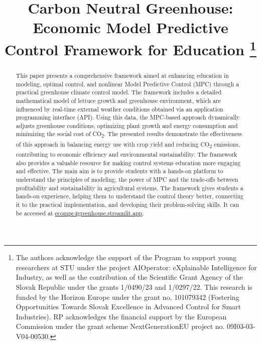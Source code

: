 \documentclass[conference]{IEEEtran}
\begin{document}
\title{\vspace*{18pt}Carbon Neutral Greenhouse: Economic Model Predictive Control Framework for Education
    \thanks{The authors acknowledge the support of the Program to support young researchers at STU under the project AIOperator: eXplainable Intelligence for Industry, as well as the contribution of the Scientific Grant Agency of the Slovak Republic under the grants 1/0490/23 and 1/0297/22. This research is funded by the Horizon Europe under the grant no. 101079342 (Fostering Opportunities Towards Slovak Excellence in Advanced Control for Smart Industries). RP acknowledges the financial support by the European Commission under the grant scheme NextGenerationEU project no. 09I03-03-V04-00530.}
}

\author{
}

\maketitle

\begin{abstract}
    This paper presents a comprehensive framework aimed at enhancing education in modeling, optimal control, and nonlinear Model Predictive Control (MPC) through a practical greenhouse climate control model. The framework includes a detailed mathematical model of lettuce growth and greenhouse environment, which are influenced by real-time external weather conditions obtained via an application programming interface (API). Using this data, the MPC-based approach dynamically adjusts greenhouse conditions, optimizing plant growth and energy consumption and minimizing the social cost of CO\textsubscript{2}. The presented results demonstrate the effectiveness of this approach in balancing energy use with crop yield and reducing CO\textsubscript{2} emissions, contributing to economic efficiency and environmental sustainability.
    The framework also provides a valuable resource for making control systems education more engaging and effective. The main aim is to provide students with a hands-on platform to understand the principles of modeling, the power of MPC and the trade-offs between profitability and sustainability in agricultural systems. The framework gives students a hands-on experience, helping them to understand the control theory better, connecting it to the practical implementation, and developing their problem-solving skills. It can be accessed at \url{ecompc4greenhouse.streamlit.app}.
\end{abstract}
\end{document}
